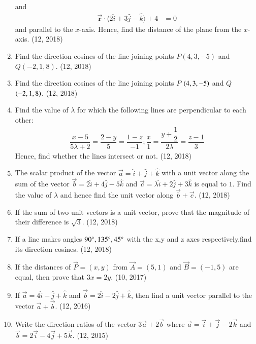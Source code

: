 \begin{enumerate}[label=\thesubsection.\arabic*,  ref=\thesubsection.\theenumi]
and 
\begin{align*}
\overrightarrow{\mathbf{r}} \cdot \langle 2\hat{i} + 3\hat{j} - \hat{k} \rangle + 4 &= 0
\end{align*}
and parallel to the $x$-axis. Hence, find the distance of the plane from the $x$-axis. \hfill (12, 2018)
\item Find the direction cosines of the line joining points $P(4, 3, -5)$ and $Q(-2, 1, 8)$. \hfill (12, 2018)
\item Find the direction cosines of the line joining points $P$ $\left(4,3,-5\right)$ and $Q$ $\left(-2,1,8\right)$.
\hfill (12, 2018)
 \item Find the value of $\lambda$ for which the following lines are perpendicular to each other:
 \begin{align*}
 \dfrac{x-5}{5\lambda+2}= \dfrac{2-y}{5} = \dfrac{1-z}{-1};\dfrac{x}{1}=\dfrac{y+\dfrac{1}{2}}{2\lambda}=\dfrac{z-1}{3} 
 \end{align*}
Hence, find whether the lines intersect or not.
\hfill (12, 2018)
\item The scalar product of the vector $\overrightarrow{a} = \hat{i} + \hat{j} + \hat{k}$ with a unit vector along the sum of the vector $\overrightarrow{b} = 2\hat{i} + 4\hat{j} - 5\hat{k}$ and $\overrightarrow{c} = \lambda \hat{i} + 2\hat{j} + 3\hat{k}$ is equal to $1$. Find the value of $\lambda$ and hence find the unit vector along $\overrightarrow{b} + \overrightarrow{c}$.
\hfill (12, 2018) 
\item If the sum of two unit vectors is a unit vector, prove that the magnitude of their difference is $\sqrt{3}$.
\hfill (12, 2018) 
\item If a line makes angles $ 90\degree,135\degree,45\degree$ with the x,y and z axes respectively,find its direction cosines.
\hfill (12, 2018) 
\item If the distances of $\vec{P} = (x, y)$ from $\vec{A} = (5, 1)$ and $\vec{B} = (-1, 5)$ are equal, then prove that $3x = 2y$. \hfill (10, 2017)
\item If $\overrightarrow{a} = 4\hat{i} - \hat{j} +\hat{k}$ and $\overrightarrow{b} = 2\hat{i} - 2\hat{j} + \hat{k}$, then find a unit vector parallel to the vector $\overrightarrow{a}+\overrightarrow{b}$. \hfill (12, 2016)
\item Write the direction ratios of the vector $3\vec{a}+2\vec{b}$ where $\vec{a} = \vec{i}+\vec{j}-2\vec{k}$ and $\vec{b} = 2\vec{i}-4\vec{j}+5\vec{k}$. \hfill (12, 2015)
\end{enumerate}
